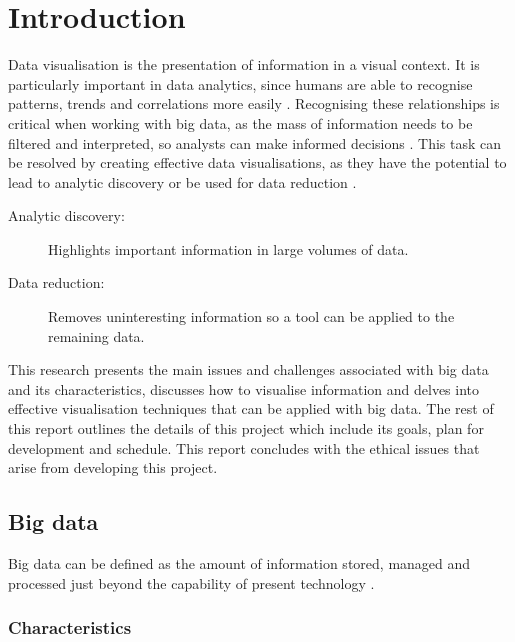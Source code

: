 \documentclass[a4paper]{article}
\begin{document}
	\section{Introduction} {
	\label{sec:introduction}
		
		Data visualisation is the presentation of information in a visual context. It is particularly important in data analytics, since humans are able to recognise patterns, trends and correlations more easily \citep{grinstein2002introduction}. Recognising these relationships is critical when working with big data, as the mass of information needs to be filtered and interpreted, so analysts can make informed decisions \citep{hendley1995case}. This task can be resolved by creating effective data visualisations, as they have the potential to lead to analytic discovery or be used for data reduction \citep{rohrer1997web}.
		
		\begin{description}
			\item[Analytic discovery:] Highlights important information in large volumes of data.
			\item[Data reduction:] Removes uninteresting information so a tool can be applied to the remaining data.
		\end{description}
		
		This research presents the main issues and challenges associated with big data and its characteristics, discusses how to visualise information and delves into effective visualisation techniques that can be applied with big data. The rest of this report outlines the details of this project which include its goals, plan for development and schedule. This report concludes with the ethical issues that arise from developing this project.
		
		\subsection{Big data} {
		
			Big data can be defined as the amount of information stored, managed and processed just beyond the capability of present technology \citep{kaisler2013big}.
			
			\subsubsection{Characteristics} {
			
}}}
\end{document}
